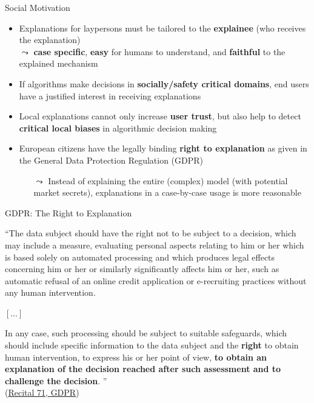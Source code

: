 \documentclass[11pt,compress,t,notes=noshow, aspectratio=169, xcolor=table]{beamer}
\begin{document}
\begin{vbframe}[c]{Social Motivation}

	\begin{itemize}
		\item Explanations for laypersons must be tailored to the \textbf{explainee} (who receives the explanation)\\ %
		$\leadsto$ \textbf{case specific}, \textbf{easy} for humans to understand, and \textbf{faithful} to the explained mechanism
		\pause
		\item If algorithms make decisions in \textbf{socially/safety critical domains}, end users have a justified interest in receiving explanations
		\pause
		\item Local explanations cannot only increase \textbf{user trust}, but also help to detect \textbf{critical local biases} in algorithmic decision making
		\pause
		\item European citizens have the legally binding \textbf{right to explanation} as given in the General Data Protection Regulation (GDPR)
		\begin{itemize}
		    \item[$\leadsto$] Instead of explaining the entire (complex) model (with potential market secrets), explanations in a case-by-case usage is more reasonable
		\end{itemize}

	\end{itemize}
\end{vbframe}


\begin{vbframe}[c]{GDPR: The Right to Explanation}

    ``The data subject should have the right not to be subject to a decision, which may include a measure, evaluating personal aspects relating to him or her which is based solely on automated processing and which produces legal effects concerning him or her or similarly significantly affects him or her, such as automatic refusal of an online credit application or e-recruiting practices without any human intervention.

$[\ldots]$

In any case, such processing should be subject to suitable safeguards, which should include specific information to the data subject and the \textbf{right} to obtain human intervention, to express his or her point of view, \textbf{to obtain an explanation of the decision reached after such assessment and to challenge the decision}.
'' \\[0.2cm] (\href{https://gdpr-text.com/read/recital-71/}{Recital 71, GDPR})
\end{vbframe}
\end{document}
